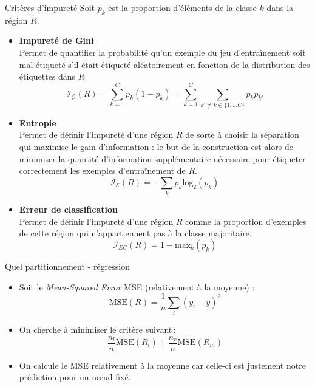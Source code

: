 \documentclass[10pt]{beamer}
\begin{document}
\begin{frame}{Critères d'impureté}
	\vspace*{-1em}
	Soit  \(p_k\) est la proportion d'éléments de la classe \(k\) dans la région \(R\).\\[0.5em]
	
	\begin{itemize}
		\item \textbf{Impureté de Gini} \\
		Permet de quantifier la probabilité qu’un exemple du jeu d’entraînement soit mal étiqueté s’il était étiqueté aléatoirement en fonction de la distribution des étiquettes dans $R$
		$$\textstyle \mathcal{I}_{\mathcal{G}}(R)=\sum_{k=1}^C p_k(1-p_k) = \sum_{k=1}^C \sum_{k' \neq k \in \{1,\dots C\}} p_k p_{k'}$$
		
		\vspace*{-0.5 em}
		\item \textbf{Entropie}\\
		Permet de définir l’impureté d’une région $R$ de sorte à choisir la séparation qui maximise le gain d’information : le but de la construction est alors de minimiser la quantité d’information supplémentaire nécessaire pour étiqueter correctement les exemples d’entraînement de $R$.
	$$ \textstyle \mathcal{I}_\mathcal{E}(R)=-\sum_k p_k \text{log}_2( p_k)$$

		\item \textbf{Erreur de classification} \\
		Permet de définir l’impureté d’une région $R$ comme la proportion d’exemples de cette région qui n’appartiennent pas à la classe majoritaire.
		 $$\mathcal{I}_{EC}(R)=1-\text{max}_k(p_k)$$
	\end{itemize}

\end{frame}

\begin{frame}{Quel partitionnement - régression}
	\begin{itemize}
		\item Soit le \textit{Mean-Squared Error} MSE (relativement à la moyenne) : 
		\[\text{MSE}(R)=\frac{1}{n}\sum_i (y_i-\bar{y})^2\]
		\item On cherche à minimiser le critère suivant\,:
		\[\frac{n_l}{n}\text{MSE}(R_l)+\frac{n_r}{n}\text{MSE}(R_m)\]
		\item On calcule le MSE relativement à la moyenne car celle-ci est justement notre prédiction pour un nœud fixé.
	\end{itemize}
	
\end{frame}
\end{document}
